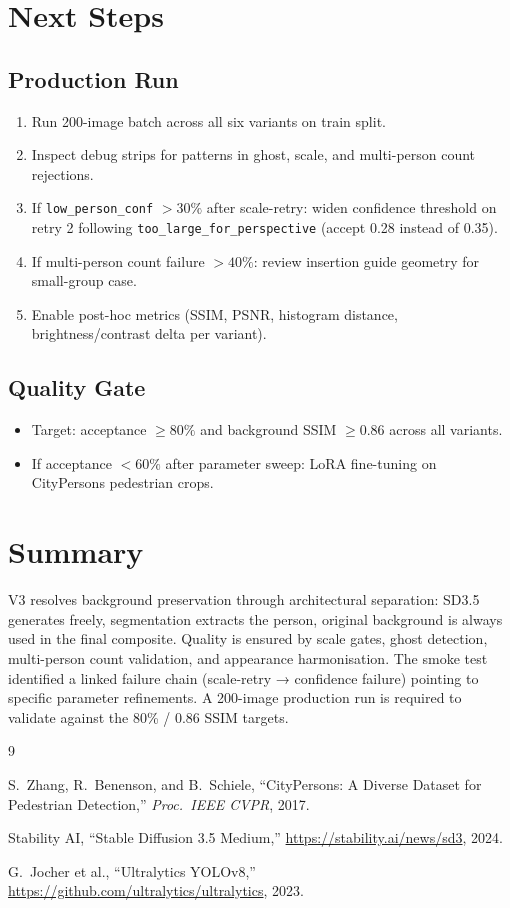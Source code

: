 \documentclass[12pt,a4paper]{article}
\begin{document}
\section{Next Steps}

\subsection{Production Run}
\begin{enumerate}
    \item Run 200-image batch across all six variants on train split.
    \item Inspect debug strips for patterns in ghost, scale, and multi-person count rejections.
    \item If \texttt{low\_person\_conf} $> 30\%$ after scale-retry: widen confidence threshold on retry 2 following \texttt{too\_large\_for\_perspective} (accept 0.28 instead of 0.35).
    \item If multi-person count failure $> 40\%$: review insertion guide geometry for small-group case.
    \item Enable post-hoc metrics (SSIM, PSNR, histogram distance, brightness/contrast delta per variant).
\end{enumerate}

\subsection{Quality Gate}
\begin{itemize}
    \item Target: acceptance $\geq 80\%$ and background SSIM $\geq 0.86$ across all variants.
    \item If acceptance $< 60\%$ after parameter sweep: LoRA fine-tuning on CityPersons pedestrian crops.
\end{itemize}

\section{Summary}

V3 resolves background preservation through architectural separation: SD3.5 generates freely, segmentation extracts the person, original background is always used in the final composite. Quality is ensured by scale gates, ghost detection, multi-person count validation, and appearance harmonisation. The smoke test identified a linked failure chain (scale-retry → confidence failure) pointing to specific parameter refinements. A 200-image production run is required to validate against the 80\% / 0.86 SSIM targets.

\begin{thebibliography}{9}

S.~Zhang, R.~Benenson, and B.~Schiele,
``CityPersons: A Diverse Dataset for Pedestrian Detection,''
\textit{Proc.\ IEEE CVPR}, 2017.

Stability AI, ``Stable Diffusion 3.5 Medium,''
\url{https://stability.ai/news/sd3}, 2024.

G.~Jocher et al., ``Ultralytics YOLOv8,''
\url{https://github.com/ultralytics/ultralytics}, 2023.

\end{thebibliography}
\end{document}

